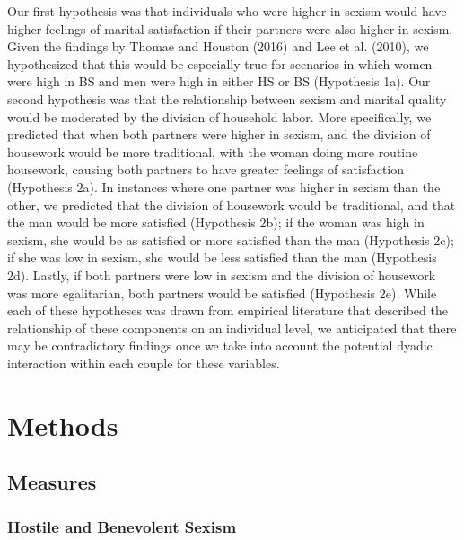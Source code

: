 \documentclass[
  man]{apa6}
\begin{document}
Our first hypothesis was that individuals who were higher in sexism would have higher feelings of marital satisfaction if their partners were also higher in sexism. Given the findings by Thomae and Houston (2016) and Lee et al. (2010), we hypothesized that this would be especially true for scenarios in which women were high in BS and men were high in either HS or BS (Hypothesis 1a). Our second hypothesis was that the relationship between sexism and marital quality would be moderated by the division of household labor. More specifically, we predicted that when both partners were higher in sexism, and the division of housework would be more traditional, with the woman doing more routine housework, causing both partners to have greater feelings of satisfaction (Hypothesis 2a). In instances where one partner was higher in sexism than the other, we predicted that the division of housework would be traditional, and that the man would be more satisfied (Hypothesis 2b); if the woman was high in sexism, she would be as satisfied or more satisfied than the man (Hypothesis 2c); if she was low in sexism, she would be less satisfied than the man (Hypothesis 2d). Lastly, if both partners were low in sexism and the division of housework was more egalitarian, both partners would be satisfied (Hypothesis 2e). While each of these hypotheses was drawn from empirical literature that described the relationship of these components on an individual level, we anticipated that there may be contradictory findings once we take into account the potential dyadic interaction within each couple for these variables.

\hypertarget{methods}{%
\section{Methods}\label{methods}}

\hypertarget{measures}{%
\subsection{Measures}\label{measures}}

\hypertarget{hostile-and-benevolent-sexism}{%
\subsubsection{Hostile and Benevolent Sexism}\label{hostile-and-benevolent-sexism}}
\end{document}
